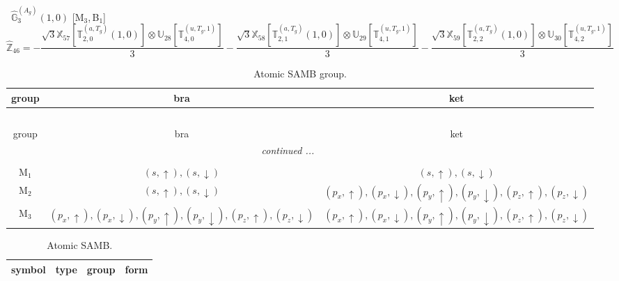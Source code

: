 \documentclass[fleqn,10pt,landscape]{article}
\begin{document}
\begin{itemize}
\vspace{4mm}
\noindent {} $\,\,\,\hat{\mathbb{G}}_{3}^{(A_{g})}(1,0)$ [M$_{3}$,\,B$_{1}$]
\begin{dmath*}
\hat{\mathbb{Z}}_{46}=- \frac{\sqrt{3} \mathbb{X}_{57}[\mathbb{T}_{2,0}^{(a,T_{g})}(1,0)] \otimes\mathbb{U}_{28}[\mathbb{T}_{4,0}^{(u,T_{g},1)}]}{3} - \frac{\sqrt{3} \mathbb{X}_{58}[\mathbb{T}_{2,1}^{(a,T_{g})}(1,0)] \otimes\mathbb{U}_{29}[\mathbb{T}_{4,1}^{(u,T_{g},1)}]}{3} - \frac{\sqrt{3} \mathbb{X}_{59}[\mathbb{T}_{2,2}^{(a,T_{g})}(1,0)] \otimes\mathbb{U}_{30}[\mathbb{T}_{4,2}^{(u,T_{g},1)}]}{3}
\end{dmath*}
\begin{center}
\renewcommand{\arraystretch}{1.3}
\begin{longtable}{c|c|c}
\caption{Atomic SAMB group.}
 \\
 \hline \hline
group & bra & ket \\ \hline \endfirsthead

\multicolumn{2}{l}{\tablename\ \thetable{}} \\
 \hline \hline
group & bra & ket \\ \hline \endhead

 \hline \hline
\multicolumn{2}{r}{\footnotesize\it continued ...} \\ \endfoot

 \hline \hline
\multicolumn{2}{r}{} \\ \endlastfoot

M$_{1}$ & $(s,\uparrow), (s,\downarrow)$ & $(s,\uparrow), (s,\downarrow)$ \\
M$_{2}$ & $(s,\uparrow), (s,\downarrow)$ & $(p_{x},\uparrow), (p_{x},\downarrow), (p_{y},\uparrow), (p_{y},\downarrow), (p_{z},\uparrow), (p_{z},\downarrow)$ \\
M$_{3}$ & $(p_{x},\uparrow), (p_{x},\downarrow), (p_{y},\uparrow), (p_{y},\downarrow), (p_{z},\uparrow), (p_{z},\downarrow)$ & $(p_{x},\uparrow), (p_{x},\downarrow), (p_{y},\uparrow), (p_{y},\downarrow), (p_{z},\uparrow), (p_{z},\downarrow)$ \\
\end{longtable}
\end{center}
\begin{center}
\renewcommand{\arraystretch}{1.3}
\begin{longtable}{c|c|c|c}
\caption{Atomic SAMB.}
 \\
 \hline \hline
symbol & type & group & form \\ \hline \endfirsthead


\end{longtable}
\end{center}
\end{itemize}
\end{document}
